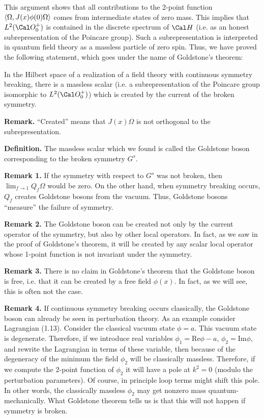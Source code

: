 This argument shows 
that all contributions to the 2-point function $\langle\Omega,J(x)\phi(0)\Omega\rangle$
comes from intermediate states of zero mass. This implies 
that $L^2(\O_0^+)$ is contained in the discrete spectrum of $\Cal H$ 
(i.e. as an honest subrepresentation of the Poincare group).
Such a subrepresentation is interpreted in quantum field theory 
as a massless particle of zero spin.  
Thus, we have proved the following statement,
which goes under the name of Goldstone's theorem: 

 In the Hilbert space 
of a realization of a field theory with continuous symmetry breaking, 
there is a massless scalar (i.e. a subrepresentation 
of the Poincare group isomorphic to $L^2(\O_0^+)$) 
which is created by the current of the broken symmetry. 
\endproclaim

{\bf Remark.} ``Created'' means that $J(x)\Omega$ is not 
orthogonal to the subrepresentation. 

{\bf Definition.}
The massless scalar which we found is called the Goldstone boson
corresponding to the broken symmetry $G^s$. 

{\bf Remark 1.} If the symmetry with respect to $G^s$ was not broken, then
$\lim_{f\to 1}Q_f\Omega$ would be zero. 
On the other hand, when symmetry breaking occurs, 
$Q_f$ creates Goldstone bosons from the vacuum. 
Thus, Goldstone bosons ``measure''
the failure of symmetry.

{\bf Remark 2.} The Goldstone boson can be created not only 
by the current operator of the symmetry, but also by other local 
operators. In fact, as we saw in the proof of Goldstone's theorem,
it will be created by any scalar local operator whose 1-point 
function is not invariant under the symmetry. 

{\bf Remark 3.} There is no claim in Goldstone's theorem that 
the Goldstone boson is free, i.e. that 
it can be created by a free field $\phi(x)$. 
In fact, as we will see, this is often not the 
case. 

{\bf Remark 4.} If continuous symmetry breaking occurs classically, 
the Goldstone boson can already be seen in
perturbation theory. As an example consider Lagrangian (1.13). Consider the 
classical vacuum state $\phi=a$. This vacuum state is degenerate. 
Therefore, if we introduce real variables $\phi_1=\text{Re}\phi-a$,  
$\phi_2=\text{Im}\phi$, and rewrite the Lagrangian in terms of
these variable, then because of the degeneracy of the minimum
the field $\phi_2$ will be classically massless. 
Therefore, if we compute the 2-point function of 
$\phi_2$ it will have a pole at $k^2=0$
(modulo the perturbation parameters). Of course, in principle loop terms 
might shift this pole. In other words, the classically massless $\phi_2$
may get nonzero mass quantum-mechanically. What Goldstone theorem tells us
is that this will not happen if symmetry is broken. 


